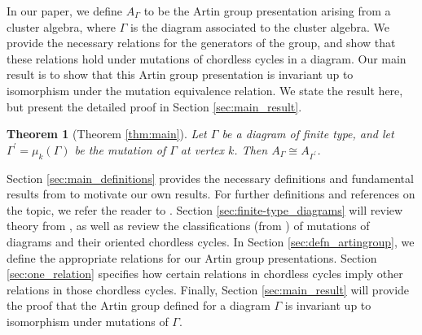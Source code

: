 \documentclass[11pt]{amsart}
\newtheorem{thm}{Theorem}[section]
\theoremstyle{definition}
\begin{document}


In our paper, we define $A_{\Gamma}$ to be the Artin group presentation arising from a cluster algebra, where $\Gamma$ is the diagram associated to the cluster algebra. We provide the necessary relations for the generators of the group, and show that these relations hold under mutations of chordless cycles in a diagram. Our main result is to show that this Artin group presentation is invariant up to isomorphism under the mutation equivalence relation. We state the result here, but present the detailed proof in Section \ref{sec:main_result}.

\begin{thm}[Theorem \ref{thm:main}]
Let $\Gamma$ be a diagram of finite type, and let $\Gamma^{\prime} = \mu_k(\Gamma)$ be the mutation of $\Gamma$ at vertex $k$. Then $A_{\Gamma} \cong A_{\Gamma^{\prime}}$.
\end{thm}


\indent Section \ref{sec:main_definitions} provides the necessary definitions and fundamental results from \cite{BM13} to motivate our own results. For further definitions and references on the topic, we refer the reader to \cite{FZ02}. Section \ref{sec:finite-type_diagrams} will review theory from \cite{FZ02}, \cite{FZ03} as well as review the classifications (from \cite{BM13}) of mutations of diagrams and their oriented chordless cycles. In Section \ref{sec:defn_artingroup}, we define the appropriate relations for our Artin group presentations. Section \ref{sec:one_relation} specifies how certain relations in chordless cycles imply other relations in those chordless cycles. Finally, Section \ref{sec:main_result} will provide the proof that the Artin group defined for a diagram $\Gamma$ is invariant up to isomorphism under mutations of $\Gamma$. \\
\end{document}
